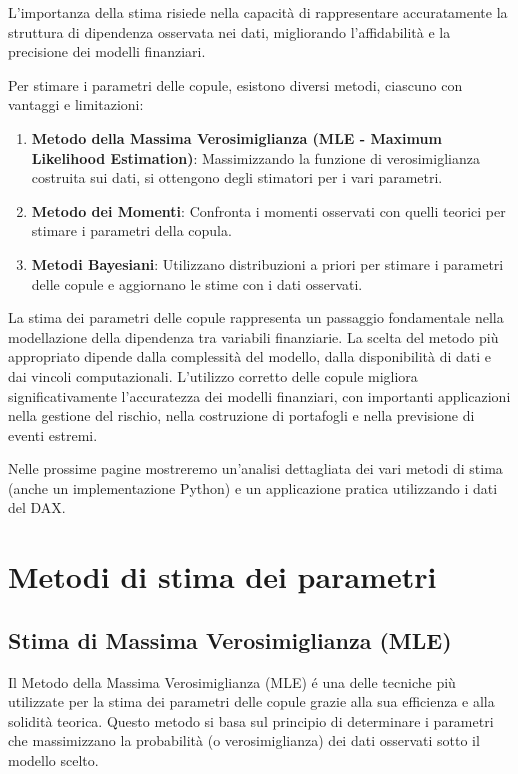 \documentclass[%
	corpo=11pt,
    twoside,
    stile=classica,
    oldstyle,
    tipotesi=custom,
    greek,
    evenboxes,
]{toptesi}
\begin{document}
L'importanza della stima risiede nella capacità di rappresentare accuratamente la struttura di dipendenza osservata nei dati, migliorando l'affidabilità e la precisione dei modelli finanziari.

Per stimare i parametri delle copule, esistono diversi metodi, ciascuno con vantaggi e limitazioni:

\begin{enumerate}
	\item \textbf{Metodo della Massima Verosimiglianza (MLE - Maximum Likelihood Estimation)}: Massimizzando la funzione di verosimiglianza costruita sui dati, si ottengono degli stimatori per i vari parametri.
	\item \textbf{Metodo dei Momenti}: Confronta i momenti osservati con quelli teorici per stimare i parametri della copula.
	\item \textbf{Metodi Bayesiani}: Utilizzano distribuzioni a priori per stimare i parametri delle copule e aggiornano le stime con i dati osservati.
\end{enumerate}

La stima dei parametri delle copule rappresenta un passaggio fondamentale nella modellazione della dipendenza tra variabili finanziarie. La scelta del metodo più appropriato dipende dalla complessità del modello, dalla disponibilità di dati e dai vincoli computazionali. L’utilizzo corretto delle copule migliora significativamente l’accuratezza dei modelli finanziari, con importanti applicazioni nella gestione del rischio, nella costruzione di portafogli e nella previsione di eventi estremi.

Nelle prossime pagine mostreremo un’analisi dettagliata dei vari metodi di
stima (anche un implementazione Python) e un applicazione pratica utilizzando i dati del DAX.

\section{Metodi di stima dei parametri}

\subsection{Stima di Massima Verosimiglianza (MLE)}

Il Metodo della Massima Verosimiglianza (MLE) é una delle tecniche
più utilizzate per la stima dei parametri delle copule grazie alla sua efficienza e alla solidità teorica. Questo metodo si basa sul principio di determinare i parametri che massimizzano la probabilità (o verosimiglianza)
dei dati osservati sotto il modello scelto.\\
\end{document}
